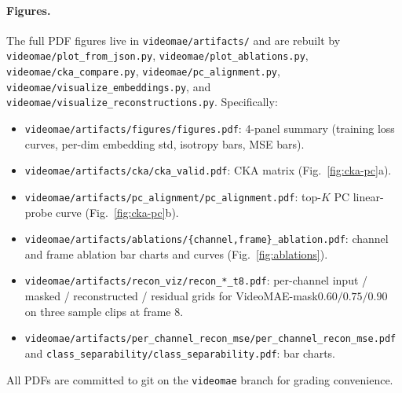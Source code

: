 \documentclass{article}
\begin{document}
\paragraph{Figures.}
The full PDF figures live in \texttt{videomae/artifacts/} and are rebuilt by
\texttt{videomae/plot\_from\_json.py}, \texttt{videomae/plot\_ablations.py},
\texttt{videomae/cka\_compare.py}, \texttt{videomae/pc\_alignment.py},
\texttt{videomae/visualize\_embeddings.py}, and
\texttt{videomae/visualize\_reconstructions.py}. Specifically:
\begin{itemize}[topsep=2pt,itemsep=0pt]
    \item \texttt{videomae/artifacts/figures/figures.pdf}: 4-panel summary
    (training loss curves, per-dim embedding std, isotropy bars, MSE bars).
    \item \texttt{videomae/artifacts/cka/cka\_valid.pdf}: CKA matrix
    (Fig.~\ref{fig:cka-pc}a).
    \item \texttt{videomae/artifacts/pc\_alignment/pc\_alignment.pdf}: top-$K$
    PC linear-probe curve (Fig.~\ref{fig:cka-pc}b).
    \item \texttt{videomae/artifacts/ablations/\{channel,frame\}\_ablation.pdf}:
    channel and frame ablation bar charts and curves (Fig.~\ref{fig:ablations}).
    \item \texttt{videomae/artifacts/recon\_viz/recon\_*\_t8.pdf}: per-channel
    input / masked / reconstructed / residual grids for
    VideoMAE-mask$0.60/0.75/0.90$ on three sample clips at frame 8.
    \item \texttt{videomae/artifacts/per\_channel\_recon\_mse/per\_channel\_recon\_mse.pdf}
    and \texttt{class\_separability/class\_separability.pdf}: bar charts.
\end{itemize}
All PDFs are committed to git on the \texttt{videomae} branch for grading
convenience.
\end{document}
